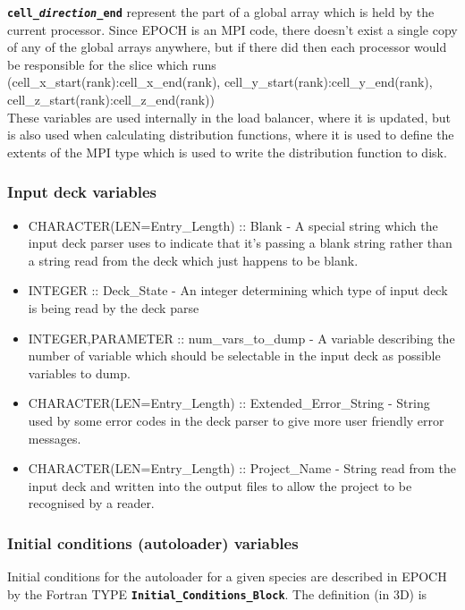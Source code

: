 \documentclass[12pt]{article}
\newcommand{\inlinecode}[1]{{\color{warwickred} \bf\texttt{#1}}}
\newcommand{\nEPOCH}{{\color{warwickdark}\fontfamily{phv}\selectfont EPOCH}}
\newcommand{\EPOCH}{{\nEPOCH} }
\begin{document}
\inlinecode{cell\_{\it direction}\_end} represent the part of a global array
which is held by the current processor. Since \EPOCH is an MPI code, there
doesn't exist a single copy of any of the global arrays anywhere, but if there
did then each processor would be responsible for the slice which runs\\
(cell\_x\_start(rank):cell\_x\_end(rank),
cell\_y\_start(rank):cell\_y\_end(rank),
cell\_z\_start(rank):cell\_z\_end(rank))\\
These variables are used internally in the load balancer, where it is updated,
but is also used when calculating distribution functions, where it is used to
define the extents of the MPI type which is used to write the distribution
function to disk.

\subsubsection{Input deck variables}
\begin{itemize}
\item CHARACTER(LEN=Entry\_Length) :: Blank - A special string which the input
  deck parser uses to indicate that it's passing a blank string rather than a
  string read from the deck which just happens to be blank.
\item INTEGER :: Deck\_State - An integer determining which type of input deck
  is being read by the deck parse
\item INTEGER,PARAMETER :: num\_vars\_to\_dump - A variable describing the
  number of variable which should be selectable in the input deck as possible
  variables to dump.
\item CHARACTER(LEN=Entry\_Length) :: Extended\_Error\_String - String used by
  some error codes in the deck parser to give more user friendly error
  messages.
\item CHARACTER(LEN=Entry\_Length) :: Project\_Name - String read from the
  input deck and written into the output files to allow the project to be
  recognised by a reader.
\end{itemize}

\subsubsection{Initial conditions (autoloader) variables}
Initial conditions for the autoloader for a given species are described in
\EPOCH by the Fortran TYPE \inlinecode{Initial\_Conditions\_Block}. The
definition (in 3D) is
\end{document}
